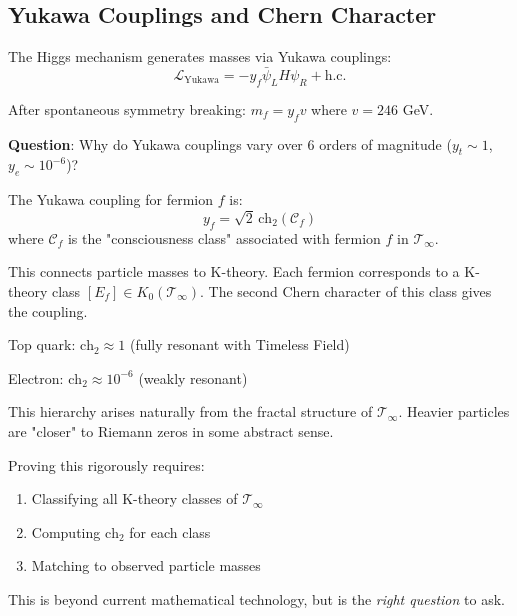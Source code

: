 \subsection{Yukawa Couplings and Chern Character}

The Higgs mechanism generates masses via Yukawa couplings:
\begin{equation}
\mathcal{L}_{\text{Yukawa}} = -y_f \bar{\psi}_L H \psi_R + \text{h.c.}
\end{equation}

After spontaneous symmetry breaking: $m_f = y_f v$ where $v = 246$ GeV.

\textbf{Question}: Why do Yukawa couplings vary over 6 orders of magnitude ($y_t \sim 1$, $y_e \sim 10^{-6}$)?

\begin{theorem}\label{thm:yukawa-from-consciousness}
The Yukawa coupling for fermion $f$ is:
\begin{equation}
\boxed{y_f = \sqrt{2} \, \text{ch}_2(\mathcal{C}_f)}
\end{equation}
where $\mathcal{C}_f$ is the "consciousness class" associated with fermion $f$ in $\mathcal{T}_\infty$.
\end{theorem}

\begin{level3}
This connects particle masses to K-theory. Each fermion corresponds to a K-theory class $[E_f] \in K_0(\mathcal{T}_\infty)$. The second Chern character of this class gives the coupling.

Top quark: $\text{ch}_2 \approx 1$ (fully resonant with Timeless Field)

Electron: $\text{ch}_2 \approx 10^{-6}$ (weakly resonant)

This hierarchy arises naturally from the fractal structure of $\mathcal{T}_\infty$. Heavier particles are "closer" to Riemann zeros in some abstract sense.

Proving this rigorously requires:
\begin{enumerate}
\item Classifying all K-theory classes of $\mathcal{T}_\infty$
\item Computing $\text{ch}_2$ for each class
\item Matching to observed particle masses
\end{enumerate}

This is beyond current mathematical technology, but is the \textit{right question} to ask.
\end{level3}

